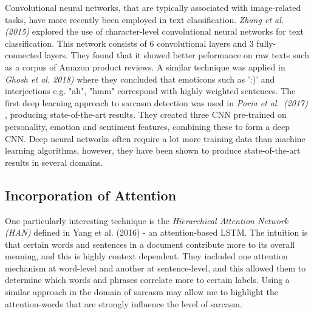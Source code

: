 \documentclass[12pt,a4paper]{article}
\begin{document}
Convolutional neural networks, that are typically associated with image-related tasks, have more recently been employed in text classification. \textit{Zhang et al. (2015)} \cite{zhang2015character} explored the use of character-level convolutional neural networks for text classification. This network consists of 6 convolutional layers and 3 fully-connected layers. They found that it showed better peformance on raw texts such as a corpus of Amazon product reviews.  A similar technique was applied in \textit{Ghosh et al. 2018)} \cite{ghosh2018sarcasm} where they concluded that emoticons such as ':)' and interjections e.g. "ah", "hmm" correspond with highly weighted sentences. The first deep learning approach to sarcasm detection was used in \textit{Poria et al.\ (2017)} \cite{poria2016deeper}, producing state-of-the-art results. They created three CNN pre-trained on personality, emotion and sentiment features, combining these to form a deep CNN. Deep neural networks often require a lot more training data than machine learning algorithms, however, they have been shown to produce state-of-the-art results in several domains.


\subsection{Incorporation of Attention}\vspace{-10pt}

One particularly interesting technique is the \textit{Hierarchical Attention Network (HAN)} defined in Yang et al. (2016) \cite{yang2016hierarchical} - an attention-based LSTM. The intuition is that certain words and sentences in a document contribute more to its overall meaning, and this is highly context dependent. They included one attention mechanism at word-level and another at sentence-level, and this allowed them to determine which words and phrases correlate more to certain labels. Using a similar approach in the domain of sarcasm may allow me to highlight the attention-words that are strongly influence the level of sarcasm.





\end{document}
